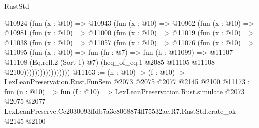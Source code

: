 \begin{lexlean}{RustStd}
\begin{coremodule}
              @10924
                (fun (x : @10) =>
                @10943
                  (fun (x : @10) =>
                  @10962
                    (fun (x : @10) =>
                    @10981
                      (fun (x : @10) =>
                      @11000
                        (fun (x : @10) =>
                        @11019
                          (fun (x : @10) =>
                          @11038
                            (fun (x : @10) =>
                            @11057
                              (fun (x : @10) =>
                              @11076
                                (fun (x : @10) =>
                                @11095
                                  (fun (x : @10) =>
                                  fun (fn : @7) =>
                                  fun (h : @11099) =>
                                  @11107
                                    @11108
                                    (Eq.refl.{2} (Sort 1) @7)
                                    (heq_of_eq.{1} @2085 @11105 @11108 @2100)))))))))))))))))
@11163 := (n : @10) -> (f : @10) -> LexLeanPreservation.Rust.FunSem @2073 @2075 @2077 @2145 @2100
@11173 := fun (n : @10) =>
  fun (f : @10) =>
  LexLeanPreservation.Rust.simulate
    @2073
    @2075
    @2077
    LexLeanPreserve.Cc2030093ffdb7a3e8068874ff75532ac.R7.RustStd.crate_ok
    @2145
    @2100
\end{coremodule}
\end{lexlean}
